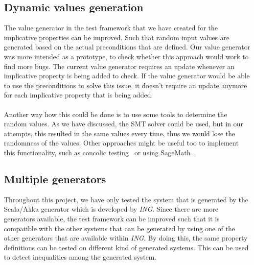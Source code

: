 \subsection*{Dynamic values generation}
The value generator in the test framework that we have created for the implicative properties can be improved. Such that random input values are generated based on the actual preconditions that are defined. Our value generator was more intended as a prototype, to check whether this approach would work to find more bugs. The current value generator requires an update whenever an implicative property is being added to check. If the value generator would be able to use the preconditions to solve this issue, it doesn't require an update anymore for each implicative property that is being added.\\
\\
Another way how this could be done is to use some tools to determine the random values. As we have discussed, the SMT solver could be used, but in our attempts, this resulted in the same values every time, thus we would lose the randomness of the values. Other approaches might be useful too to implement this functionality, such as concolic testing~\cite{sen2006cute} or using SageMath~\cite{siteSageMath2017}. %

\subsection*{Multiple generators}
Throughout this project, we have only tested the system that is generated by the Scala/Akka generator which is developed by \textit{ING}. Since there are more generators available, the test framework can be improved such that it is compatible with the other systems that can be generated by using one of the other generators that are available within \textit{ING}. By doing this, the same property definitions can be tested on different kind of generated systems. This can be used to detect inequalities among the generated system.

